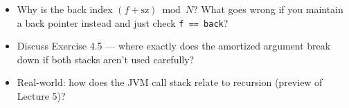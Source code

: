 \documentclass[11pt]{article}
\begin{document}
\begin{disbox}
\begin{itemize}[leftmargin=*]
  \item Why is the back index $(f+\text{sz}) \bmod N$? What goes wrong if you maintain a back pointer instead and just check \texttt{f == back}?
  \item Discuss Exercise 4.5 --- where exactly does the amortized argument break down if both stacks aren't used carefully?
  \item Real-world: how does the JVM call stack relate to recursion (preview of Lecture 5)?
\end{itemize}
\end{disbox}
\end{document}
